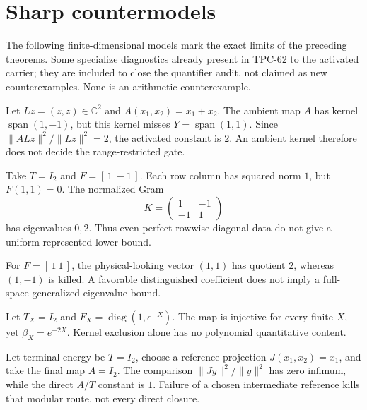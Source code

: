 \section{Sharp countermodels}

The following finite-dimensional models mark the exact limits of the preceding
theorems. Some specialize diagnostics already present in TPC-62 to the
activated carrier; they are included to close the quantifier audit, not claimed
as new counterexamples. None is an arithmetic counterexample.

\begin{example}
Let \(Lz=(z,z)\in\mathbb C^2\) and \(A(x_1,x_2)=x_1+x_2\). The ambient map
\(A\) has kernel \(\operatorname{span}(1,-1)\), but this kernel misses
\(Y=\operatorname{span}(1,1)\). Since
\(\|ALz\|^2/\|Lz\|^2=2\), the activated constant is \(2\). An ambient kernel
therefore does not decide the range-restricted gate.
\end{example}

\begin{example}
Take \(T=I_2\) and \(F=[\,1\ -1\,]\). Each row column has squared norm \(1\),
but \(F(1,1)=0\). The normalized Gram
\[
 K=\begin{pmatrix}1&-1\\-1&1\end{pmatrix}
\]
has eigenvalues \(0,2\). Thus even perfect rowwise diagonal data do not give a
uniform represented lower bound.
\end{example}

\begin{example}
For \(F=[\,1\ 1\,]\), the physical-looking vector \((1,1)\) has quotient \(2\),
whereas \((1,-1)\) is killed. A favorable distinguished coefficient does not
imply a full-space generalized eigenvalue bound.
\end{example}

\begin{example}
Let \(T_X=I_2\) and \(F_X=\operatorname{diag}(1,e^{-X})\). The map is injective
for every finite \(X\), yet \(\beta_X=e^{-2X}\). Kernel exclusion alone has no
polynomial quantitative content.
\end{example}

\begin{example}
Let terminal energy be \(T=I_2\), choose a reference projection
\(J(x_1,x_2)=x_1\), and take the final map \(A=I_2\). The comparison
\(\|Jy\|^2/\|y\|^2\) has zero infimum, while the direct \(A/T\) constant is
\(1\). Failure of a chosen intermediate reference kills that modular route,
not every direct closure.
\end{example}

